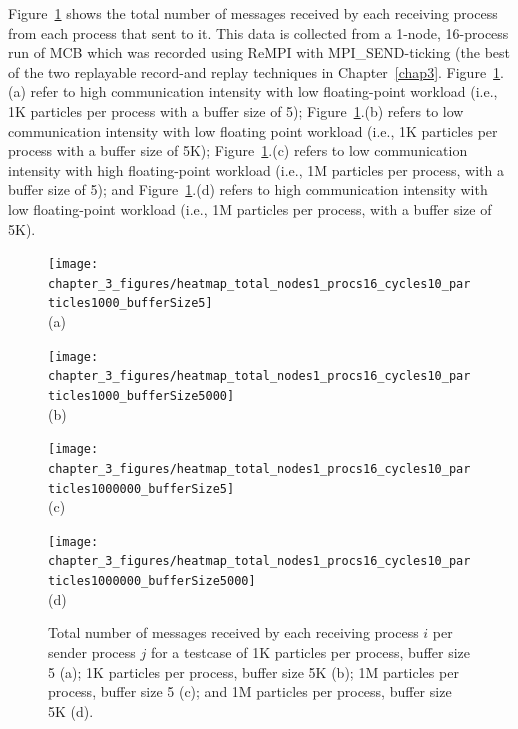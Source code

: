 Figure~\ref{fig:heatmaps_total} shows the total number of messages
received by each receiving process from each process that sent to
it. This data is collected from a 1-node, 16-process run of MCB which
was recorded using ReMPI with MPI\_SEND-ticking (the best of the two
replayable record-and replay techniques in
Chapter~\ref{chap3}. Figure~\ref{fig:heatmaps_total}.(a) refer to high
communication intensity with low floating-point workload (i.e., 1K
particles per process with a buffer size of 5);
Figure~\ref{fig:heatmaps_total}.(b) refers to low communication
intensity with low floating point workload (i.e., 1K particles per
process with a buffer size of 5K); Figure~\ref{fig:heatmaps_total}.(c)
refers to low communication intensity with high floating-point
workload (i.e., 1M particles per process, with a buffer size of 5);
and Figure~\ref{fig:heatmaps_total}.(d) refers to high communication
intensity with low floating-point workload (i.e., 1M particles per
process, with a buffer size of 5K).
\begin{figure}[ht!]
    \begin{minipage}[b]{0.5\linewidth}
        \centering
     \texttt{[image: chapter\_3\_figures/heatmap\_total\_nodes1\_procs16\_cycles10\_particles1000\_bufferSize5]}
        \\ (a) \\ 
    \end{minipage}%
    \begin{minipage}[b]{0.5\linewidth}
        \centering
     \texttt{[image: chapter\_3\_figures/heatmap\_total\_nodes1\_procs16\_cycles10\_particles1000\_bufferSize5000]}
       \\ (b) \\
    \end{minipage}
    \begin{minipage}[b]{0.5\linewidth}
        \centering
        \texttt{[image: chapter\_3\_figures/heatmap\_total\_nodes1\_procs16\_cycles10\_particles1000000\_bufferSize5]}
       \\ (c) \\
    \end{minipage}%
    \begin{minipage}[b]{0.5\linewidth}
        \centering
        \texttt{[image: chapter\_3\_figures/heatmap\_total\_nodes1\_procs16\_cycles10\_particles1000000\_bufferSize5000]}
       \\ (d) \\
    \end{minipage}
    \caption{Total number of messages received by each receiving
      process $i$ per sender process $j$ for a testcase of 1K
      particles per process, buffer size 5 (a); 1K particles per
      process, buffer size 5K (b); 1M particles per process, buffer
      size 5 (c); and 1M particles per process, buffer size 5K (d).}
    \label{fig:heatmaps_total}
\end{figure}


